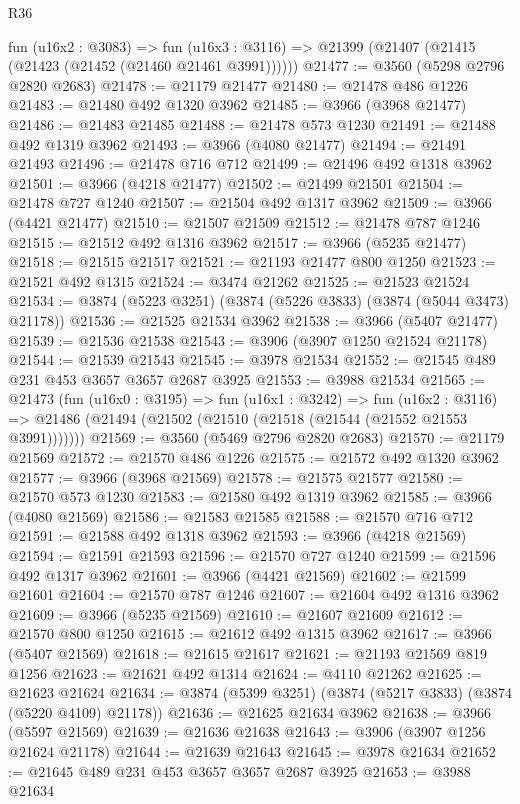 \begin{lexlean}{R36}
\begin{coremodule}
    fun (u16x2 : @3083) =>
    fun (u16x3 : @3116) => @21399 (@21407 (@21415 (@21423 (@21452 (@21460 @21461 @3991))))))
@21477 := @3560 (@5298 @2796 @2820 @2683)
@21478 := @21179 @21477
@21480 := @21478 @486 @1226
@21483 := @21480 @492 @1320 @3962
@21485 := @3966 (@3968 @21477)
@21486 := @21483 @21485
@21488 := @21478 @573 @1230
@21491 := @21488 @492 @1319 @3962
@21493 := @3966 (@4080 @21477)
@21494 := @21491 @21493
@21496 := @21478 @716 @712
@21499 := @21496 @492 @1318 @3962
@21501 := @3966 (@4218 @21477)
@21502 := @21499 @21501
@21504 := @21478 @727 @1240
@21507 := @21504 @492 @1317 @3962
@21509 := @3966 (@4421 @21477)
@21510 := @21507 @21509
@21512 := @21478 @787 @1246
@21515 := @21512 @492 @1316 @3962
@21517 := @3966 (@5235 @21477)
@21518 := @21515 @21517
@21521 := @21193 @21477 @800 @1250
@21523 := @21521 @492 @1315
@21524 := @3474 @21262
@21525 := @21523 @21524
@21534 := @3874 (@5223 @3251) (@3874 (@5226 @3833) (@3874 (@5044 @3473) @21178))
@21536 := @21525 @21534 @3962
@21538 := @3966 (@5407 @21477)
@21539 := @21536 @21538
@21543 := @3906 (@3907 @1250 @21524 @21178)
@21544 := @21539 @21543
@21545 := @3978 @21534
@21552 := @21545 @489 @231 @453 @3657 @3657 @2687 @3925
@21553 := @3988 @21534
@21565 := @21473
    (fun (u16x0 : @3195) =>
    fun (u16x1 : @3242) =>
    fun (u16x2 : @3116) =>
    @21486 (@21494 (@21502 (@21510 (@21518 (@21544 (@21552 @21553 @3991)))))))
@21569 := @3560 (@5469 @2796 @2820 @2683)
@21570 := @21179 @21569
@21572 := @21570 @486 @1226
@21575 := @21572 @492 @1320 @3962
@21577 := @3966 (@3968 @21569)
@21578 := @21575 @21577
@21580 := @21570 @573 @1230
@21583 := @21580 @492 @1319 @3962
@21585 := @3966 (@4080 @21569)
@21586 := @21583 @21585
@21588 := @21570 @716 @712
@21591 := @21588 @492 @1318 @3962
@21593 := @3966 (@4218 @21569)
@21594 := @21591 @21593
@21596 := @21570 @727 @1240
@21599 := @21596 @492 @1317 @3962
@21601 := @3966 (@4421 @21569)
@21602 := @21599 @21601
@21604 := @21570 @787 @1246
@21607 := @21604 @492 @1316 @3962
@21609 := @3966 (@5235 @21569)
@21610 := @21607 @21609
@21612 := @21570 @800 @1250
@21615 := @21612 @492 @1315 @3962
@21617 := @3966 (@5407 @21569)
@21618 := @21615 @21617
@21621 := @21193 @21569 @819 @1256
@21623 := @21621 @492 @1314
@21624 := @4110 @21262
@21625 := @21623 @21624
@21634 := @3874 (@5399 @3251) (@3874 (@5217 @3833) (@3874 (@5220 @4109) @21178))
@21636 := @21625 @21634 @3962
@21638 := @3966 (@5597 @21569)
@21639 := @21636 @21638
@21643 := @3906 (@3907 @1256 @21624 @21178)
@21644 := @21639 @21643
@21645 := @3978 @21634
@21652 := @21645 @489 @231 @453 @3657 @3657 @2687 @3925
@21653 := @3988 @21634

\end{coremodule}
\end{lexlean}
